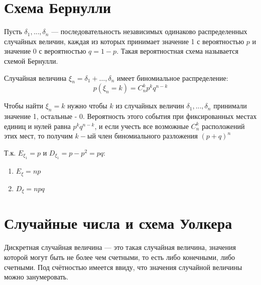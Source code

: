 
\section{Схема Бернулли}

\begin{definition}
    Пусть $\delta_1,...,\delta_n$ — последовательность независимых одинаково распределенных
    случайных величин, каждая из которых принимает значение 1 с вероятностью $p$ и
    значение 0 с вероятностью $q = 1-p$. Такая вероятностная схема называется схемой Бернулли.

\end{definition}

\begin{definition}
    Случайная величина $\xi_n = \delta_1 + \ldots, \delta_n$ имеет биномиальное распределение:
    \[p(\xi_n = k) = C_{n}^{k} p^{k}q^{n-k}\]
\end{definition}

\begin{remark}
    Чтобы найти $\xi_n=k$ нужно чтобы $k$ из случайных величин $\delta_1,...,\delta_n$ принимали значение 1, остальные - 0. 
    Вероятность этого события при фиксированных местах единиц и нулей равна $p^kq^{n-k}$, и если учесть все возможные $C_n^k$ расположений этих мест, то получим $k-$ый член биномиального разложения $(p+q)^n$
\end{remark}

\begin{properties}
    Т.к. $E_{\xi_1} = p$ и $D_{\xi_1} = p - p^2 = pq$:

    \begin{enumerate}
        \item $E_{\xi} = np$
        \item $D_{\xi} = npq$
    \end{enumerate}

\end{properties}

\section{Случайные числа и схема Уолкера}

Дискретная случайная величина — это такая случайная величина,
значения которой могут быть не более чем счетными, то есть либо
конечными, либо счетными. Под счётностью имеется ввиду, что значения 
случайной величины можно занумеровать. 


